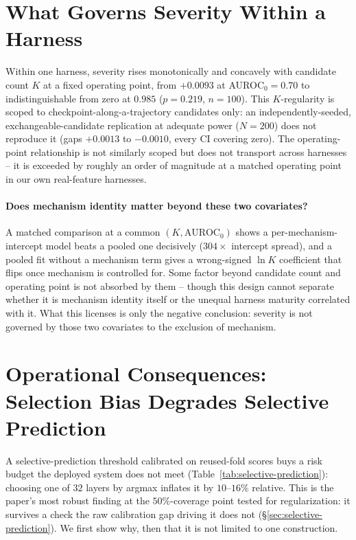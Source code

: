 \documentclass{article}
\begin{document}
\section{What Governs Severity Within a Harness}
\label{sec:severity}

Within one harness, severity rises monotonically and concavely with candidate
count $K$ at a fixed operating point, from $+0.0093$ at AUROC$_0=0.70$ to
indistinguishable from zero at $0.985$ ($p=0.219$, $n=100$). This
$K$-regularity is scoped to checkpoint-along-a-trajectory candidates only: an
independently-seeded, exchangeable-candidate replication at adequate power
($N=200$) does not reproduce it (gaps $+0.0013$ to $-0.0010$, every CI covering
zero). The operating-point relationship is not similarly scoped but does not
transport across harnesses -- it is exceeded by roughly an order of magnitude
at a matched operating point in our own real-feature harnesses.

\paragraph{Does mechanism identity matter beyond these two covariates?} A
matched comparison at a common $(K,\text{AUROC}_0)$ shows a
per-mechanism-intercept model beats a pooled one decisively ($304\times$
intercept spread), and a pooled fit without a mechanism term gives a
wrong-signed $\ln K$ coefficient that flips once mechanism is controlled for.
Some factor beyond candidate count and operating point is not absorbed by them
-- though this design cannot separate whether it is mechanism identity itself
or the unequal harness maturity correlated with it. What this licenses is only
the negative conclusion: severity is not governed by those two covariates to
the exclusion of mechanism.

\section{Operational Consequences: Selection Bias Degrades Selective Prediction}
\label{sec:calibration-bridge}

A selective-prediction threshold calibrated on reused-fold scores buys a risk
budget the deployed system does not meet
(Table~\ref{tab:selective-prediction}): choosing one of $32$ layers by argmax
inflates it by $10$--$16\%$ relative. This is the paper's most robust
finding at the $50\%$-coverage point tested for regularization: it survives a
check the raw calibration gap driving it does not
(\S\ref{sec:selective-prediction}). We first show why, then that it is not
limited to one construction.
\end{document}
